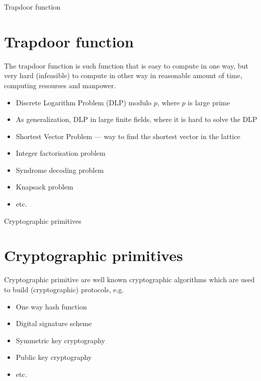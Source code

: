\documentclass{beamer}
\begin{document}
\begin{frame}{Trapdoor function}
    \section{Trapdoor function}
    \begin{definition}
        The trapdoor function is such function that is easy to compute in one 
        way, but very hard (infeasible) to compute in other way in reasonable
        amount of time, computing resourses and manpower.
    \end{definition}

    \begin{example}
        \begin{itemize}
            \item Discrete Logarithm Problem (DLP) modulo $p$, where $p$ is large prime
            \item As generalization, DLP in large finite fields, where it is hard 
            to solve the DLP
            \item Shortest Vector Problem --- way to find the shortest vector 
            in the lattice
            \item Integer factorisation problem
            \item Syndrome decoding problem 
            \item Knapsack problem 
            \item etc.
        \end{itemize}    
    \end{example}
\end{frame}

\begin{frame}{Cryptographic primitives}
    \section{Cryptographic primitives}
    \begin{definition}
        Cryptographic primitive are well known cryptographic algorithms which 
        are used to build (cryptographic) protocols, e.g. 
        \begin{itemize}
            \item One way hash function
            \item Digital signature scheme 
            \item Symmetric key cryptography
            \item Public key cryptography
            \item etc.
        \end{itemize}
    \end{definition}
\end{frame}
\end{document}
